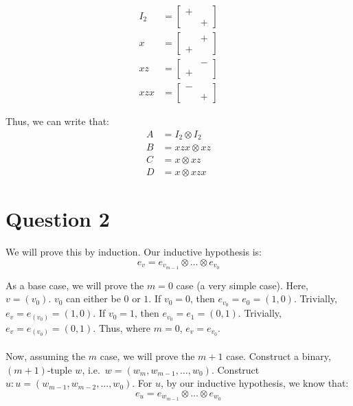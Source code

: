 \documentclass[letterpaper]{article}
\begin{document}
\begin{align*}
    I_2 &= \begin{bmatrix} + & \\ & + \end{bmatrix}
    \\
    x &= \begin{bmatrix} & + \\ + & \end{bmatrix}
    \\
    xz &= \begin{bmatrix} & - \\ + & \end{bmatrix}
    \\
    xzx &= \begin{bmatrix} - & \\ & + \end{bmatrix}
\end{align*}

Thus, we can write that:
\begin{align}
    A &= I_2 \otimes I_2 \label{eqA} \\
    B &= xzx \otimes xz \label{eqB} \\
    C &= x \otimes xz \label{eqC} \\
    D &= x \otimes xzx \label{eqD}
\end{align}

\section{Question 2}
\label{sec:Question2}

We will prove this by induction.
Our inductive hypothesis is:
\[
    e_v = e_{v_{m-1}} \otimes \ldots \otimes e_{v_{0}}
\]

As a base case, we will prove the $ m = 0 $ case (a very simple case).
Here, $ v = (v_0) $.
$ v_0 $ can either be $ 0 $ or $ 1 $.
If $ v_0 = 0 $, then $ e_{v_0} = e_0 = (1,0) $.
Trivially, $ e_v = e_{(v_0)} = (1,0) $.
If $ v_0 = 1 $, then $ e_{v_0} = e_1 = (0,1) $.
Trivially, $ e_v = e_{(v_0)} = (0,1) $.
Thus, where $ m = 0 $, $ e_v = e_{v_0} $.
\\ \\
Now, assuming the $ m $ case, we will prove the $ m + 1 $ case.
Construct a binary, $ (m + 1) $-tuple $ w $, i.e.\ $ w = (w_m, w_{m-1}, \ldots, w_0) $.
Construct $ u : u = (w_{m-1}, w_{m-2}, \ldots, w_0) $.
For $ u $, by our inductive hypothesis, we know that:
$$ e_u = e_{w_{m-1}} \otimes \ldots \otimes e_{w_{0}} $$
\end{document}
